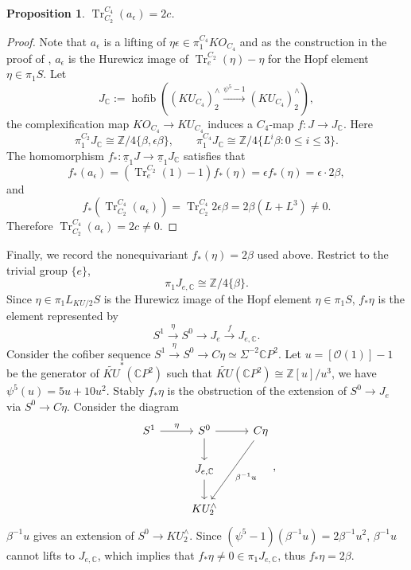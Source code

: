 \documentclass{amsart}
\theoremstyle{plain}
\newtheorem{proposition}[theorem]{Proposition}
\theoremstyle{definition}
\theoremstyle{remark}
\begin{document}
\begin{proposition}
    $\operatorname{Tr}_{C_2}^{C_4}(a_\epsilon)=2c$.
\end{proposition}
\begin{proof}
    Note that $a_\epsilon$ is a lifting of $\eta\epsilon\in \pi_1^{C_4}KO_{C_4}$ and as the construction in the proof of , $a_\epsilon$ is the Hurewicz image of $\operatorname{Tr}_e^{C_2}(\eta)-\eta$ for the Hopf element $\eta\in \pi_1 S$. 
    Let
    \[
    J_{\mathbb C} := \operatorname{hofib} \left( (KU_{C_4})^\wedge_2\xrightarrow{\psi^5-1}(KU_{C_4})^\wedge_2 \right), 
    \]
    the complexification map $KO_{C_4}\to KU_{C_4}$ induces a $C_4$-map $f:J\to J_{\mathbb{C}}$. Here 
    \[
    \pi_1^{C_2} J_{\mathbb{C}}\cong \mathbb{Z}/4\{\beta, \epsilon\beta\}, \qquad \pi_1^{C_4} J_{\mathbb{C}}\cong \mathbb{Z}/4\{L^i\beta:0\leq i\leq 3\}.
    \]
    The homomorphism $f_*: \underline{\pi}_1 J \to \underline{\pi}_1 J_{\mathbb{C}}$ satisfies that 
    \[
    f_*(a_\epsilon)= (\operatorname{Tr}_e^{C_2}(1)-1) f_*(\eta) = \epsilon f_*(\eta) =\epsilon \cdot 2\beta, 
    \]
    and 
    \[ 
    f_*(\operatorname{Tr}_{C_2}^{C_4}(a_\epsilon))=\operatorname{Tr}_{C_2}^{C_4} 2\epsilon \beta = 2 \beta (L+L^3) \neq 0.
    \]
    Therefore $\operatorname{Tr}_{C_2}^{C_4}(a_\epsilon) = 2c \neq 0$.
\end{proof}

Finally, we record the nonequivariant $f_*(\eta)=2\beta$ used above. Restrict to the trivial group $\{e\}$,
\[
\pi_1J_{e,\mathbb C} \cong \mathbb Z/4\{\beta\}.
\]
Since $\eta\in \pi_1 L_{KU/2}S$ is the Hurewicz image of the Hopf element $\eta\in \pi_1S$, $f_*\eta$ is the element represented by 
\[
 S^1\xrightarrow{\eta} S^0 \to J_e \xrightarrow{f} J_{e,\mathbb{C}}.
\]
Consider the cofiber sequence $S^1\xrightarrow{\eta} S^0 \to C\eta\simeq \Sigma^{-2}\mathbb CP^2$. 
Let $u=[\mathcal O(1)]-1$ be the generator of $\widetilde{KU}^*(\mathbb{C}P^2)$ such that $\widetilde{KU}(\mathbb{C}P^2)\cong \mathbb{Z}[u]/u^3$, we have $\psi^5(u)=5u+10u^2$.
Stably $f_*\eta$ is the obstruction of the extension of $S^0\to J_e$ via $S^0\to C\eta$. Consider the diagram 
\[
\begin{tikzcd}
    S^1 \arrow[r,"\eta"] & S^0 \arrow[r]\arrow[d]  & C\eta\arrow[ldd,"\beta^{-1}u"]\\
    & J_{e,\mathbb{C}} \arrow[d] &\\
    & KU_2^\wedge &
\end{tikzcd},
\]
$\beta^{-1}u$ gives an extension of $S^0\to KU_2^\wedge$. Since $(\psi^5-1)(\beta^{-1}u)=2\beta^{-1}u^2$, $\beta^{-1}u$ cannot lifts to $J_{e,\mathbb{C}}$, which implies that $f_*\eta\neq 0\in \pi_1 J_{e,\mathbb{C}}$, thus $f_*\eta=2\beta$.










\end{document}
